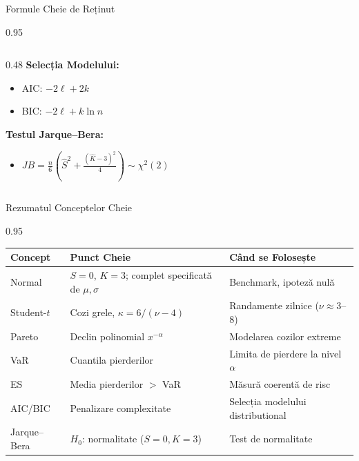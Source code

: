 \documentclass[9pt, aspectratio=169, t]{beamer}
\begin{document}
\begin{frame}{Formule Cheie de Reținut}
\begin{cminipage}{0.95\textwidth}
\begin{columns}[T]
\begin{column}{0.48\textwidth}
            \textbf{Selecția Modelului:}
            \begin{itemize}\setlength{\itemsep}{0pt}
                \item AIC: $-2\ell + 2k$
                \item BIC: $-2\ell + k\ln n$
            \end{itemize}

            \vspace{0.3cm}

            \textbf{Testul Jarque--Bera:}
            \begin{itemize}\setlength{\itemsep}{0pt}
                \item $JB = \frac{n}{6}\left(\hat{S}^2 + \frac{(\hat{K}-3)^2}{4}\right) \sim \chi^2(2)$
            \end{itemize}
        \end{column}
    \end{columns}
\end{cminipage}
\end{frame}

\begin{frame}{Rezumatul Conceptelor Cheie}
\begin{cminipage}{0.95\textwidth}
    \begin{center}
    \small
    \begin{tabular}{lll}
        \toprule
        \textbf{Concept} & \textbf{Punct Cheie} & \textbf{Când se Folosește} \\
        \midrule
        Normal & $S=0$, $K=3$; complet specificată de $\mu, \sigma$ & Benchmark, ipoteză nulă \\
        Student-$t$ & Cozi grele, $\kappa = 6/(\nu-4)$ & Randamente zilnice ($\nu \approx 3$--$8$) \\
        Pareto & Declin polinomial $x^{-\alpha}$ & Modelarea cozilor extreme \\
        \midrule
        VaR & Cuantila pierderilor & Limita de pierdere la nivel $\alpha$ \\
        ES & Media pierderilor $>$ VaR & Măsură coerentă de risc \\
        \midrule
        AIC/BIC & Penalizare complexitate & Selecția modelului distributional \\
        Jarque--Bera & $H_0$: normalitate ($S=0, K=3$) & Test de normalitate \\
        \bottomrule
    \end{tabular}
    \end{center}
\end{cminipage}
\end{frame}
\end{document}
